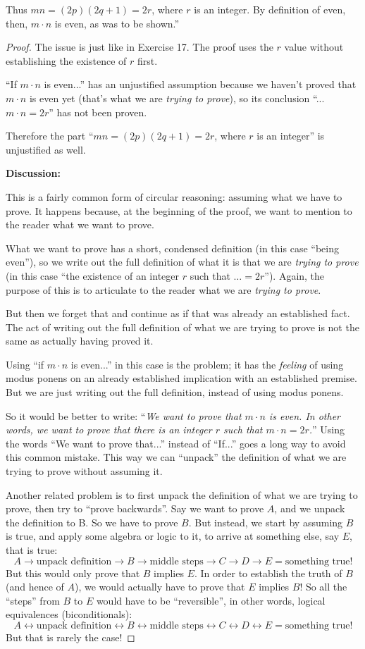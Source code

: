 \documentclass[14pt]{extarticle}
\newcommand{\bic}{\leftrightarrow}
\begin{document}
Thus $mn = (2p)(2q + 1) = 2r$, where $r$ is an integer. By definition of even, then, $m\cdot n$ is even, as was to be shown.”

\begin{proof}
The issue is just like in Exercise 17. The proof uses the $r$ value without establishing the existence of $r$ first. 

``If $m \cdot n$ is even...'' has an unjustified assumption because we haven't proved that $m \cdot n$ is even yet (that's what we are {\it trying to prove}), so its conclusion ``...$m\cdot n = 2r$'' has not been proven.

Therefore the part ``$mn = (2p)(2q + 1) = 2r$, where $r$ is an integer'' is unjustified as well.

{\bf Discussion:}

This is a fairly common form of circular reasoning: assuming what we have to prove. It happens because, at the beginning of the proof, we want to mention to the reader what we want to prove. 

What we want to prove has a short, condensed definition (in this case ``being even''), so we write out the full definition of what it is that we are {\it trying to prove} (in this case ``the existence of an integer $r$ such that $\ldots = 2r$''). Again, the purpose of this is to articulate to the reader what we are {\it trying to prove}.

But then we forget that and continue as if that was already an established fact. The act of writing out the full definition of what we are trying to prove is not the same as actually having proved it.

Using ``if $m\cdot n$ is even...'' in this case is the problem; it has the {\it feeling} of using modus ponens on an already established implication with an established premise. But we are just writing out the full definition, instead of using modus ponens.

So it would be better to write: ``{\it We want to prove that $m\cdot n$ is even. In other words, we want to prove that there is an integer $r$ such that $m \cdot n = 2r$.}'' Using the words ``We want to prove that...'' instead of ``If...'' goes a long way to avoid this common mistake. This way we can ``unpack'' the definition of what we are trying to prove without assuming it.

Another related problem is to first unpack the definition of what we are trying to prove, then try to ``prove backwards''. Say we want to prove $A$, and we unpack the definition to B. So we have to prove $B$. But instead, we start by assuming $B$ is true, and apply some algebra or logic to it, to arrive at something else, say $E$, that is true:
$$
A \to \text{unpack definition} \to B \to \text{middle steps} \to C \to D \to E = \text{something true!}
$$
But this would only prove that $B$ implies $E$. In order to establish the truth of $B$ (and hence of $A$), we would actually have to prove that $E$ implies $B$! So all the ``steps'' from $B$ to $E$ would have to be ``reversible'', in other words, logical equivalences (biconditionals):
$$
A \bic \text{unpack definition} \bic B \bic \text{middle steps} \bic C \bic D \bic E = \text{something true!}
$$
But that is rarely the case!
\end{proof}
\end{document}

